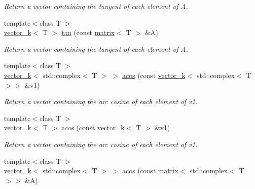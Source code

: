 \begin{DoxyCompactItemize}
\begin{DoxyCompactList}\small\item\em Return a vector containing the tangent of each element of A. \end{DoxyCompactList}\item 
\hypertarget{namespacekeycpp_a7310a65b84d58bffa91cd81d14fbf81a}{{\footnotesize template$<$class T $>$ }\\\hyperlink{classkeycpp_1_1vector__k}{vector\-\_\-k}$<$ T $>$ \hyperlink{namespacekeycpp_a7310a65b84d58bffa91cd81d14fbf81a}{tan} (const \hyperlink{classkeycpp_1_1matrix}{matrix}$<$ T $>$ \&A)}\label{namespacekeycpp_a7310a65b84d58bffa91cd81d14fbf81a}

\begin{DoxyCompactList}\small\item\em Return a vector containing the tangent of each element of A. \end{DoxyCompactList}\item 
\hypertarget{namespacekeycpp_a877d94927f5459e9cdaa50c11e8ffd3c}{{\footnotesize template$<$class T $>$ }\\\hyperlink{classkeycpp_1_1vector__k}{vector\-\_\-k}$<$ std\-::complex$<$ T $>$ $>$ \hyperlink{namespacekeycpp_a877d94927f5459e9cdaa50c11e8ffd3c}{acos} (const \hyperlink{classkeycpp_1_1vector__k}{vector\-\_\-k}$<$ std\-::complex$<$ T $>$$>$ \&v1)}\label{namespacekeycpp_a877d94927f5459e9cdaa50c11e8ffd3c}

\begin{DoxyCompactList}\small\item\em Return a vector containing the arc cosine of each element of v1. \end{DoxyCompactList}\item 
\hypertarget{namespacekeycpp_a1c98db9af87a464e8258138f98d9c029}{{\footnotesize template$<$class T $>$ }\\\hyperlink{classkeycpp_1_1vector__k}{vector\-\_\-k}$<$ T $>$ \hyperlink{namespacekeycpp_a1c98db9af87a464e8258138f98d9c029}{acos} (const \hyperlink{classkeycpp_1_1vector__k}{vector\-\_\-k}$<$ T $>$ \&v1)}\label{namespacekeycpp_a1c98db9af87a464e8258138f98d9c029}

\begin{DoxyCompactList}\small\item\em Return a vector containing the arc cosine of each element of v1. \end{DoxyCompactList}\item 
\hypertarget{namespacekeycpp_ae1811725cd4c1026bf8c9fa426694a6d}{{\footnotesize template$<$class T $>$ }\\\hyperlink{classkeycpp_1_1vector__k}{vector\-\_\-k}$<$ std\-::complex$<$ T $>$ $>$ \hyperlink{namespacekeycpp_ae1811725cd4c1026bf8c9fa426694a6d}{acos} (const \hyperlink{classkeycpp_1_1matrix}{matrix}$<$ std\-::complex$<$ T $>$$>$ \&A)}\label{namespacekeycpp_ae1811725cd4c1026bf8c9fa426694a6d}


\end{DoxyCompactItemize}
